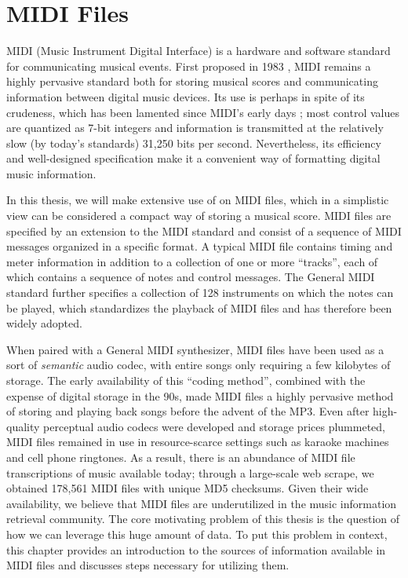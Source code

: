 \chapter{MIDI Files}
\label{ch:midi}

MIDI (Music Instrument Digital Interface) is a hardware and software standard for communicating musical events.
First proposed in 1983 \cite{international1983midi}, MIDI remains a highly pervasive standard both for storing musical scores and communicating information between digital music devices.
Its use is perhaps in spite of its crudeness, which has been lamented since MIDI's early days \cite{moore1988dysfunctions}; most control values are quantized as 7-bit integers and information is transmitted at the relatively slow (by today's standards) 31,250 bits per second.
Nevertheless, its efficiency and well-designed specification make it a convenient way of formatting digital music information.

In this thesis, we will make extensive use of on MIDI files, which in a simplistic view can be considered a compact way of storing a musical score.
MIDI files are specified by an extension to the MIDI standard \cite{international1988standard} and consist of a sequence of MIDI messages organized in a specific format.
A typical MIDI file contains timing and meter information in addition to a collection of one or more ``tracks'', each of which contains a sequence of notes and control messages.
The General MIDI standard \cite{international1991general} further specifies a collection of 128 instruments on which the notes can be played, which standardizes the playback of MIDI files and has therefore been widely adopted.

When paired with a General MIDI synthesizer, MIDI files have been used as a sort of {\em semantic} audio codec, with entire songs only requiring a few kilobytes of storage.
The early availability of this ``coding method'', combined with the expense of digital storage in the 90s, made MIDI files a highly pervasive method of storing and playing back songs before the advent of the MP3.
Even after high-quality perceptual audio codecs were developed and storage prices plummeted, MIDI files remained in use in resource-scarce settings such as karaoke machines and cell phone ringtones.
As a result, there is an abundance of MIDI file transcriptions of music available today; through a large-scale web scrape, we obtained 178,561 MIDI files with unique MD5 checksums.
Given their wide availability, we believe that MIDI files are underutilized in the music information retrieval community.
The core motivating problem of this thesis is the question of how we can leverage this huge amount of data.
To put this problem in context, this chapter provides an introduction to the sources of information available in MIDI files and discusses steps necessary for utilizing them.

